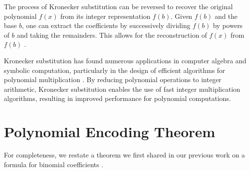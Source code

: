 \documentclass[12pt,reqno]{article}
\theoremstyle{plain}
\theoremstyle{definition}
\begin{document}
The process of Kronecker substitution can be reversed to recover the original polynomial $f(x)$ from its integer representation $f(b)$. Given $f(b)$ and the base $b$, one can extract the coefficients by successively dividing $f(b)$ by powers of $b$ and taking the remainders. This allows for the reconstruction of $f(x)$ from $f(b)$ \cite{grimaldi2004discrete}.

Kronecker substitution has found numerous applications in computer algebra and symbolic computation, particularly in the design of efficient algorithms for polynomial multiplication \cite{harvey2009kronecker, harvey2014faster}. By reducing polynomial operations to integer arithmetic, Kronecker substitution enables the use of fast integer multiplication algorithms, resulting in improved performance for polynomial computations.

\section{Polynomial Encoding Theorem}
For completeness, we restate a theorem we first shared in our previous work on a formula for binomial coefficients \cite{shunia2023simple}.
\end{document}
